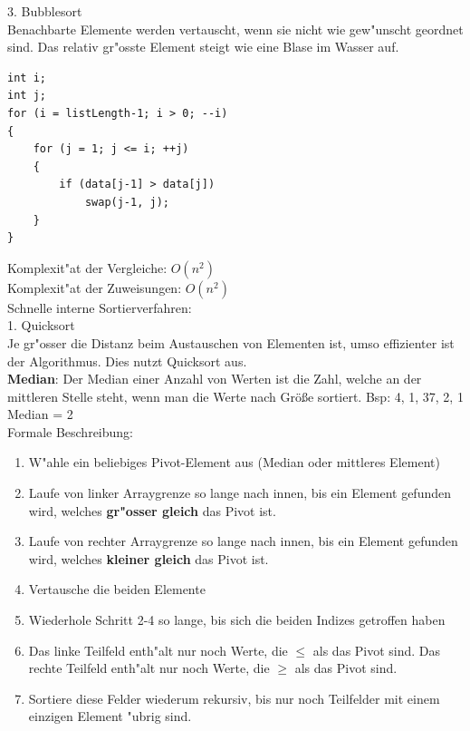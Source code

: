 3. Bubblesort\\
Benachbarte Elemente werden vertauscht, wenn sie nicht wie gew"unscht geordnet sind. Das relativ gr"osste Element steigt wie eine Blase im Wasser auf. 
\begin{lstlisting}[style=C]
int i;
int j;
for (i = listLength-1; i > 0; --i)
{
	for (j = 1; j <= i; ++j)
	{
		if (data[j-1] > data[j])
			swap(j-1, j);
	}
}
\end{lstlisting} 
Komplexit"at der Vergleiche: $O(n^2)$\\
Komplexit"at der Zuweisungen: $O(n^2)$\\

Schnelle interne Sortierverfahren:\\
1. Quicksort\\
Je gr"osser die Distanz beim Austauschen von Elementen ist, umso effizienter ist der Algorithmus. Dies nutzt Quicksort aus.\\
\textbf{Median}: Der Median einer Anzahl von Werten ist die Zahl, welche an der mittleren Stelle steht, wenn man die Werte nach Größe sortiert. Bsp: {4, 1, 37, 2, 1} Median = 2\\
Formale Beschreibung: \\
\begin{enumerate}
\item W"ahle ein beliebiges Pivot-Element aus (Median oder mittleres Element)
\item Laufe von linker Arraygrenze so lange nach innen, bis ein Element gefunden wird, welches \textbf{gr"osser gleich} das Pivot ist. 
\item Laufe von rechter Arraygrenze so lange nach innen, bis ein Element gefunden wird, welches \textbf{kleiner gleich} das Pivot ist. 
\item Vertausche die beiden Elemente
\item Wiederhole Schritt 2-4 so lange, bis sich die beiden Indizes getroffen haben
\item Das linke Teilfeld enth"alt nur noch Werte, die $\leq$ als das Pivot sind. Das rechte Teilfeld enth"alt nur noch Werte, die $\geq$ als das Pivot sind. 
\item Sortiere diese Felder wiederum rekursiv, bis nur noch Teilfelder mit einem einzigen Element "ubrig sind.
\end{enumerate}

